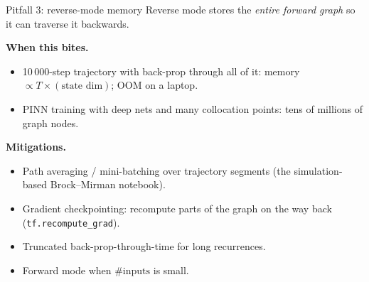 \documentclass[aspectratio=169,11pt]{beamer}
\newcommand{\emphc}[1]{\textcolor{harvardcrimson}{#1}}
\begin{document}
\begin{frame}{Pitfall 3: reverse-mode memory}
\footnotesize Reverse mode stores the \emph{entire forward graph} so it can traverse it backwards.
\vspace{-2pt}
\begin{center}
\end{center}
\textbf{When this bites.}
\begin{itemize}\itemsep1pt
\item 10\,000-step trajectory with back-prop through all of it: memory $\propto T\times(\text{state dim})$; OOM on a laptop.
\item PINN training with deep nets and many collocation points: tens of millions of graph nodes.
\end{itemize}
\textbf{Mitigations.}
\begin{itemize}\itemsep1pt
\item \emphc{Path averaging / mini-batching} over trajectory segments (the simulation-based Brock--Mirman notebook).
\item \emphc{Gradient checkpointing}: recompute parts of the graph on the way back (\texttt{tf.recompute\_grad}).
\item \emphc{Truncated back-prop-through-time} for long recurrences.
\item \emphc{Forward mode} when $\#\text{inputs}$ is small.
\end{itemize}
\end{frame}
\end{document}
